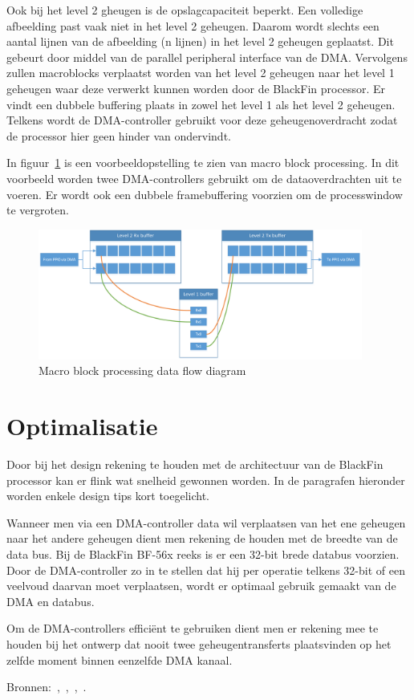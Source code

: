 		\par Ook bij het level 2 gheugen is de opslagcapaciteit beperkt. Een volledige afbeelding past vaak niet in het level 2 geheugen. Daarom wordt slechts een aantal lijnen van de afbeelding (n lijnen) in het level 2 geheugen geplaatst. Dit gebeurt door middel van de parallel peripheral interface van de DMA. Vervolgens zullen macroblocks verplaatst worden van het level 2 geheugen naar het level 1 geheugen waar deze verwerkt kunnen worden door de BlackFin processor. Er vindt een dubbele buffering plaats in zowel het level 1 als het level 2 geheugen. Telkens wordt de DMA-controller gebruikt voor deze geheugenoverdracht zodat de processor hier geen hinder van ondervindt.

		\par In figuur~\ref{fig:block_processing} is een voorbeeldopstelling te zien van macro block processing. In dit voorbeeld worden twee DMA-controllers gebruikt om de dataoverdrachten uit te voeren. Er wordt ook een dubbele framebuffering voorzien om de processwindow te vergroten.

			\begin{figure}[H]
				\centering
				\includegraphics[width=0.95\textwidth]{Chapters/Chapter4/Images/DMA_block_matrix.png}
				\caption{Macro block processing data flow diagram}
				\label{fig:block_processing}
			\end{figure}
	\newpage
	\section{Optimalisatie}
		
		\par Door bij het design rekening te houden met de architectuur van de BlackFin processor kan er flink wat snelheid gewonnen worden. In de paragrafen hieronder worden enkele design tips kort toegelicht.

		\par Wanneer men via een DMA-controller data wil verplaatsen van het ene geheugen naar het andere geheugen dient men rekening de houden met de breedte van de data bus. Bij de BlackFin BF-56x reeks is er een 32-bit brede databus voorzien. Door de DMA-controller zo in te stellen dat hij per operatie telkens 32-bit of een veelvoud daarvan moet verplaatsen, wordt er optimaal gebruik gemaakt van de DMA en databus.

		\par Om de DMA-controllers effici\"ent te gebruiken dient men er rekening mee te houden bij het ontwerp dat nooit twee geheugentransferts plaatsvinden op het zelfde moment binnen eenzelfde DMA kanaal. 

		Bronnen:~\cite{bib_6},~\cite{bib_8},~\cite{bib_10},~\cite{bib_11}.


